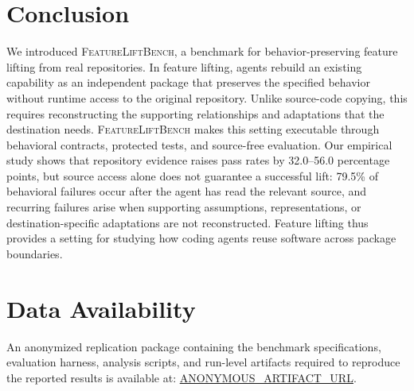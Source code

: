\documentclass[acmsmall,screen,review,anonymous]{acmart}
\newcommand{\flb}{\textsc{FeatureLiftBench}\xspace}
\begin{document}
\section{Conclusion}

We introduced \flb, a benchmark for behavior-preserving feature lifting from
real repositories. In feature lifting, agents rebuild an existing capability as
an independent package that preserves the specified behavior without runtime
access to the original repository. Unlike source-code copying, this requires
reconstructing the supporting relationships and adaptations that the
destination needs. \flb makes this setting executable through behavioral
contracts, protected tests, and source-free evaluation.
Our empirical study shows that repository evidence raises pass rates by
32.0--56.0 percentage points, but source access alone does not guarantee a
successful lift: 79.5\% of behavioral failures occur after the agent has read
the relevant source, and recurring failures arise when supporting assumptions,
representations, or destination-specific adaptations are not reconstructed.
Feature lifting thus provides a setting for studying how coding agents reuse
software across package boundaries.


\section*{Data Availability}
An anonymized replication package containing the benchmark specifications,
evaluation harness, analysis scripts, and run-level artifacts required to
reproduce the reported results is available at:
\url{ANONYMOUS_ARTIFACT_URL}.

\FloatBarrier


\end{document}
